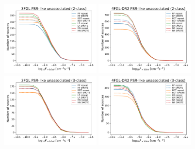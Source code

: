 \documentclass{aa}
\begin{document}
\begin{appendix}
\begin{figure}[h]
\centering
\hspace*{-0.5cm}
\includegraphics[width=0.45\textwidth]{plots/oversample/N_logS_3FGL_PSR_2classes_O_vs_S.pdf}
\hspace*{-0.5cm}
\includegraphics[width=0.45\textwidth]{plots/oversample/N_logS_4FGL-DR2_PSR_2classes_O_vs_S.pdf}\\
\hspace*{-0.5cm}
\includegraphics[width=0.45\textwidth]{plots/oversample/N_logS_3FGL_PSR_3classes_O_vs_S.pdf}
\hspace*{-0.5cm}
\includegraphics[width=0.45\textwidth]{plots/oversample/N_logS_4FGL-DR2_PSR_3classes_O_vs_S.pdf}\\

\end{figure}
\end{appendix}
\end{document}
